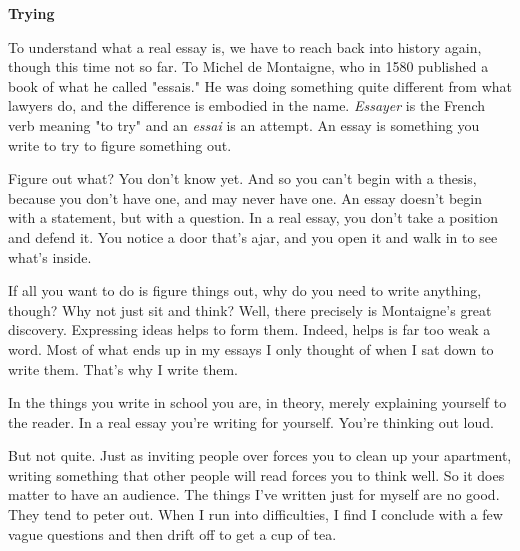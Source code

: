 \textbf{Trying}

To understand what a real essay is, we have to
                  reach back into history again, though this time not so far. To
                  Michel de Montaigne, who in 1580 published a book of what he
                  called "essais." He was doing something quite different from
                  what lawyers do, and the difference is embodied in the name.
                  \emph{Essayer} is the French verb meaning "to try" and an
                  \emph{essai} is an attempt. An essay is something you write to
                  try to figure something out.

Figure out what? You
                  don't know yet. And so you can't begin with a thesis, because
                  you don't have one, and may never have one. An essay doesn't
                  begin with a statement, but with a question. In a real essay,
                  you don't take a position and defend it. You notice a door
                  that's ajar, and you open it and walk in to see what's
                  inside.

If all you want to do is figure things out,
                  why do you need to write anything, though? Why not just sit
                  and think? Well, there precisely is Montaigne's great
                  discovery. Expressing ideas helps to form them. Indeed, helps
                  is far too weak a word. Most of what ends up in my essays I
                  only thought of when I sat down to write them. That's why I
                  write them.

In the things you write in school you
                  are, in theory, merely explaining yourself to the reader. In a
                  real essay you're writing for yourself. You're thinking out
                  loud.

But not quite. Just as inviting people over
                  forces you to clean up your apartment, writing something that
                  other people will read forces you to think well. So it does
                  matter to have an audience. The things I've written just for
                  myself are no good. They tend to peter out. When I run into
                  difficulties, I find I conclude with a few vague questions and
                  then drift off to get a cup of tea.

